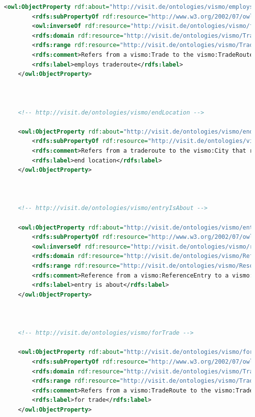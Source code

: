 \begin{lstlisting}[caption={VisMo Ontologie in der letzten (englischen) Version.},label={lst:vismo},captionpos=b,language=xml]
    <owl:ObjectProperty rdf:about="http://visit.de/ontologies/vismo/employsTraderoute">
        <rdfs:subPropertyOf rdf:resource="http://www.w3.org/2002/07/owl#topObjectProperty"/>
        <owl:inverseOf rdf:resource="http://visit.de/ontologies/vismo/forTrade"/>
        <rdfs:domain rdf:resource="http://visit.de/ontologies/vismo/Trade"/>
        <rdfs:range rdf:resource="http://visit.de/ontologies/vismo/Traderoute"/>
        <rdfs:comment>Refers from a vismo:Trade to the vismo:TradeRoute that the trade is fullfilled on.</rdfs:comment>
        <rdfs:label>employs traderoute</rdfs:label>
    </owl:ObjectProperty>
    


    <!-- http://visit.de/ontologies/vismo/endLocation -->

    <owl:ObjectProperty rdf:about="http://visit.de/ontologies/vismo/endLocation">
        <rdfs:subPropertyOf rdf:resource="http://visit.de/ontologies/vismo/routeLocation"/>
        <rdfs:comment>Refers from a traderoute to the vismo:City that represents the ending point for the route.</rdfs:comment>
        <rdfs:label>end location</rdfs:label>
    </owl:ObjectProperty>
    


    <!-- http://visit.de/ontologies/vismo/entryIsAbout -->

    <owl:ObjectProperty rdf:about="http://visit.de/ontologies/vismo/entryIsAbout">
        <rdfs:subPropertyOf rdf:resource="http://www.w3.org/2002/07/owl#topObjectProperty"/>
        <owl:inverseOf rdf:resource="http://visit.de/ontologies/vismo/referencedByEntry"/>
        <rdfs:domain rdf:resource="http://visit.de/ontologies/vismo/ReferenceEntry"/>
        <rdfs:range rdf:resource="http://visit.de/ontologies/vismo/Resource"/>
        <rdfs:comment>Reference from a vismo:ReferenceEntry to a vismo:Resource, associating the describing nature of the associated vismo:Reference.</rdfs:comment>
        <rdfs:label>entry is about</rdfs:label>
    </owl:ObjectProperty>
    


    <!-- http://visit.de/ontologies/vismo/forTrade -->

    <owl:ObjectProperty rdf:about="http://visit.de/ontologies/vismo/forTrade">
        <rdfs:subPropertyOf rdf:resource="http://www.w3.org/2002/07/owl#topObjectProperty"/>
        <rdfs:domain rdf:resource="http://visit.de/ontologies/vismo/Traderoute"/>
        <rdfs:range rdf:resource="http://visit.de/ontologies/vismo/Trade"/>
        <rdfs:comment>Refers from a vismo:TradeRoute to the vismo:Trade resource that illustrates the trading on the given route.</rdfs:comment>
        <rdfs:label>for trade</rdfs:label>
    </owl:ObjectProperty>
    



\end{lstlisting}
